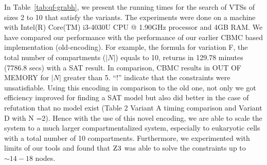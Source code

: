 


In Table~\ref{tab:qf-grabh}, we present the running times for the search of
VTSs of sizes 2 to 10 that satisfy the variants.
%
The experiments were done on a machine with Intel(R) Core(TM) i3-4030U
CPU @ 1.90GHz processor and 4GB RAM.
%
We have compared our performance with the performance of our earlier 
CBMC based implementation (old-encoding).
%
For example, the formula for variation F, the total number of
compartments ($|N|$) equals to 10, returns in 129.78 minutes (7786.8 secs)
with a SAT result.
%
In comparison, CBMC results in OUT OF MEMORY for $|N|$ greater than 5.
%
``!'' indicate that the constraints were unsatisfiable.
%
Using this encoding in comparison to the old one, not only we got efficiency improved for finding a SAT model but also did better in the case of refutation that no model exist (Table 2 Variant A timing comparison and Variant D with N =2). Hence with the use of this novel encoding, we are able to scale the system to a much larger compartmentalized system, especially to
eukaryotic cells with a total number of 10 compartments.
%
%
Furthermore, we experimented with limits of our tools and found
that $\textsc{Z3}$ was able to solve the constraints up to $\sim{14-18}$ nodes.



% 






